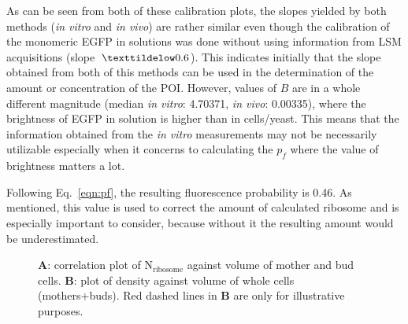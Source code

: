 As can be seen from both of these calibration plots, the slopes yielded by both methods (\textit{in vitro} and \textit{in vivo}) are rather similar even though the calibration of the monomeric EGFP in solutions was done without using information from LSM acquisitions (slope~$\texttildelow 0.6$). 
This indicates initially that the slope obtained from both of this methods can be used in the determination of the amount or concentration of the POI. However, values of $B$ are in a whole different magnitude (median \textit{in vitro}: 4.70371, \textit{in vivo}: 0.00335), where the brightness of EGFP in solution is higher than in cells/yeast. 
This means that the information obtained from the \textit{in vitro} measurements may not be necessarily utilizable especially when it concerns to calculating the $p_{f}$ where the value of brightness matters a lot.

Following Eq.~\ref{eqn:pf}, the resulting fluorescence probability is 0.46. As mentioned, this value is used to correct the amount of calculated ribosome and is especially important to consider, because without it the resulting amount would be underestimated.

\begin{figure}[!h]
\centering
{}\hfill
{}
\caption{\textbf{A}: correlation plot of N$_{\text{ribosome}}$ against volume of mother and bud cells. 
\textbf{B}: plot of density against volume of whole cells (mothers+buds). 
Red dashed lines in \textbf{B} are only for illustrative purposes. }
\label{fig:corplot}
\end{figure}

